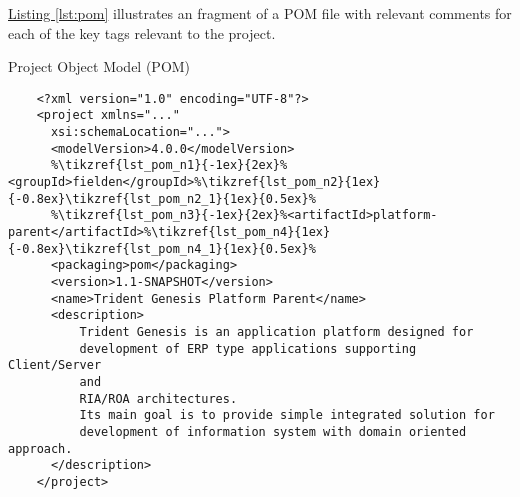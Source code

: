   \hyperref[lst:pom]{Listing \ref{lst:pom}} illustrates an fragment of a POM file with relevant comments for each of the key tags relevant to the project.


  \begin{code}{Project Object Model (POM)}{\label{lst:pom}}
    \begin{lstlisting}
    <?xml version="1.0" encoding="UTF-8"?>
    <project xmlns="..."
	  xsi:schemaLocation="...">
	  <modelVersion>4.0.0</modelVersion>
	  %\tikzref{lst_pom_n1}{-1ex}{2ex}%<groupId>fielden</groupId>%\tikzref{lst_pom_n2}{1ex}{-0.8ex}\tikzref{lst_pom_n2_1}{1ex}{0.5ex}%
	  %\tikzref{lst_pom_n3}{-1ex}{2ex}%<artifactId>platform-parent</artifactId>%\tikzref{lst_pom_n4}{1ex}{-0.8ex}\tikzref{lst_pom_n4_1}{1ex}{0.5ex}%
	  <packaging>pom</packaging>
	  <version>1.1-SNAPSHOT</version>
	  <name>Trident Genesis Platform Parent</name>
	  <description>
		  Trident Genesis is an application platform designed for
		  development of ERP type applications supporting Client/Server
		  and
		  RIA/ROA architectures.
		  Its main goal is to provide simple integrated solution for 
		  development of information system with domain oriented approach. 
	  </description>
    </project> 
    \end{lstlisting}


  \end{code}

